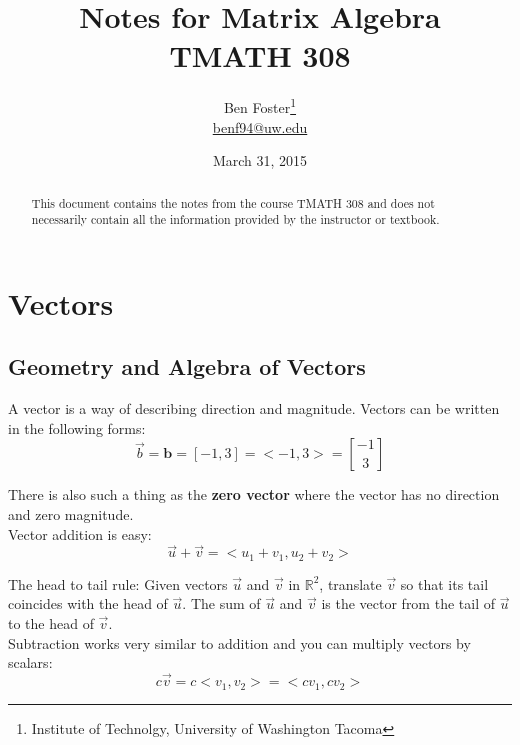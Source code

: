 \documentclass{article}
\begin{document}
{
	\title{Notes for Matrix Algebra \\ TMATH 308}
	\author{Ben Foster\thanks{
		Institute of Technolgy, University of Washington Tacoma} \\
		\url{benf94@uw.edu}
	}
	\date{March 31, 2015}
	\maketitle
	\thispagestyle{empty} %
	\begin{abstract}
	\centering
		This document contains the notes from the course TMATH 308 and does not necessarily
		contain all the information provided by the instructor or textbook.
	\end{abstract}
	\clearpage
	\tableofcontents
	\clearpage
	\setcounter{page}{1}
}

\section{Vectors} %
	
	\subsection{Geometry and Algebra of Vectors}
	A vector is a way of describing direction and magnitude. Vectors can be written in the following 
	forms:
	\[ \vec{b} = \textbf{b} = [-1,3] = <-1,3> = {-1 \brack 3} \]
	
	There is also such a thing as the \textbf{zero vector} where the vector has no direction and zero 
	magnitude. \\
	
	Vector addition is easy:
	\[ \vec{u} + \vec{v} = <u_1 + v_1, u_2 + v_2> \]
	
	The head to tail rule: Given vectors $\vec{u}$ and $\vec{v}$ in $\mathbb{R}^2$, translate $
	\vec{v}$ so 
	that its tail coincides with the head of $\vec{u}$. The sum of $\vec{u}$ and $\vec{v}$ is the 
	vector from the tail of $\vec{u}$ to the head of $\vec{v}$.\\
	
	Subtraction works very similar to addition and you can multiply vectors by scalars:
	\[ c\vec{v} = c<v_1,v_2> = <cv_1, cv_2> \]
	
\end{document}
